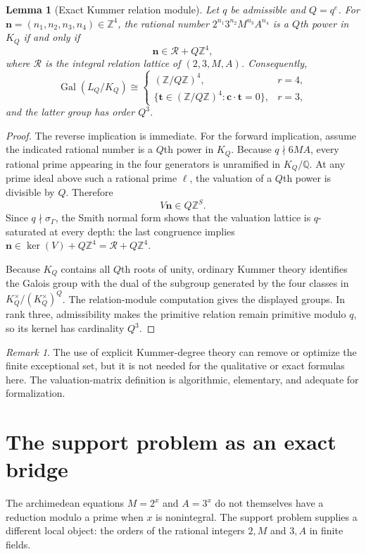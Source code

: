 \documentclass[11pt]{article}
\newtheorem{lemma}[theorem]{Lemma}
\theoremstyle{definition}
\theoremstyle{remark}
\newtheorem{remark}[theorem]{Remark}
\newcommand{\Q}{\mathbb{Q}}
\newcommand{\Z}{\mathbb{Z}}
\newcommand{\Gal}{\operatorname{Gal}}
\begin{document}
\begin{lemma}[Exact Kummer relation module]\label{lem:kummermodule}
Let $q$ be admissible and $Q=q^e$.  For
$\bm n=(n_1,n_2,n_3,n_4)\in\Z^4$, the rational number
$2^{n_1}3^{n_2}M^{n_3}A^{n_4}$ is a $Q$th power in $K_Q$ if and only if
\[
 \bm n\in \mathcal R+Q\Z^4,
\]
where $\mathcal R$ is the integral relation lattice of $(2,3,M,A)$.  Consequently,
\[
 \Gal(L_Q/K_Q)\cong
 \begin{cases}
   (\Z/Q\Z)^4,&r=4,\\
   \{\bm t\in(\Z/Q\Z)^4:\bm c\cdot\bm t=0\},&r=3,
 \end{cases}
\]
and the latter group has order $Q^3$.
\end{lemma}
\begin{proof}
The reverse implication is immediate.  For the forward implication, assume the indicated
rational number is a $Q$th power in $K_Q$.  Because $q\nmid6MA$, every rational prime appearing
in the four generators is unramified in $K_Q/\Q$.  At any prime ideal above such a rational
prime $\ell$, the valuation of a $Q$th power is divisible by $Q$.  Therefore
\[
        V\bm n\in Q\Z^S.
\]
Since $q\nmid\sigma_\Gamma$, the Smith normal form shows that the valuation lattice is
$q$-saturated at every depth: the last congruence implies
$\bm n\in\ker(V)+Q\Z^4=\mathcal R+Q\Z^4$.

Because $K_Q$ contains all $Q$th roots of unity, ordinary Kummer theory identifies the Galois
group with the dual of the subgroup generated by the four classes in
$K_Q^\times/(K_Q^\times)^Q$.  The relation-module computation gives the displayed groups.  In
rank three, admissibility makes the primitive relation remain primitive modulo $q$, so its
kernel has cardinality $Q^3$.
\end{proof}

\begin{remark}
The use of explicit Kummer-degree theory can remove or optimize the finite exceptional set, but
it is not needed for the qualitative or exact formulas here.  The valuation-matrix definition is
algorithmic, elementary, and adequate for formalization.
\end{remark}

\section{The support problem as an exact bridge}
\label{sec:support}

The archimedean equations $M=2^x$ and $A=3^x$ do not themselves have a reduction modulo a
prime when $x$ is nonintegral.  The support problem supplies a different local object: the
orders of the rational integers $2,M$ and $3,A$ in finite fields.
\end{document}
